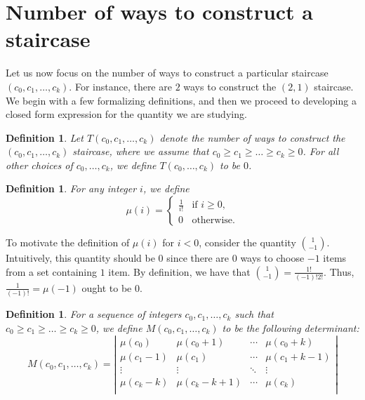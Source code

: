 \documentclass[12pt]{amsart}
\newtheorem{definition}[theorem]{Definition}
\newcommand{\ifact}{\mu}
\newcommand{\M}{M}
\newcommand{\newsection}[2]{
\section{#1 \label{#2}}
}
\begin{document}
\newsection{Number of ways to construct a staircase}{sec:numconstructions}
Let us now focus on the number of ways to construct a particular staircase $(c_0, c_1, \dots, c_k)$. For instance, there are $2$ ways to construct the $(2,1)$ staircase. We begin with a few formalizing definitions, and then we proceed to developing a closed form expression for the quantity we are studying.

\begin{definition}
Let $T(c_0, c_1, \dots, c_k)$ denote the number of ways to construct the $(c_0, c_1, \dots, c_k)$ staircase, where we assume that $c_0 \geq c_1 \geq \dots \geq c_k \geq 0$. For all other choices of $c_0, \dots, c_k$, we define $T(c_0, \dots, c_k)$ to be $0$.
\end{definition}




\begin{definition}
For any integer $i$, we define
$$
\ifact(i) = 
\begin{cases}
\frac{1}{i!} & \text{if } i \geq 0, \\
0 & \text{otherwise.}
\end{cases}
$$
\end{definition}

To motivate the definition of $\ifact(i)$ for $i < 0$, consider the quantity $\binom{1}{-1}$. Intuitively, this quantity should be $0$ since there are $0$ ways to choose $-1$ items from a set containing $1$ item. By definition, we have that $\binom{1}{-1} = \frac{1!}{(-1)!2!}$. Thus, $\frac{1}{(-1)!} = \ifact(-1)$ ought to be $0$.

\begin{definition}
For a sequence of integers $c_0, c_1, \dots, c_k$ such that $c_0 \geq c_1 \geq \dots \geq c_k \geq 0$, we define $\M(c_0, c_1, \dots, c_k)$ to be the following determinant:
$$
\M(c_0, c_1, \dots, c_k) = \left|
\begin{matrix}
\ifact(c_0) & \ifact(c_0+1) & \cdots & \ifact(c_0+k) \\
\ifact(c_1-1) & \ifact(c_1) & \cdots & \ifact(c_1+k-1) \\
\vdots & \vdots & \ddots & \vdots \\
\ifact(c_k-k) & \ifact(c_k-k+1) & \cdots & \ifact(c_k) \\
\end{matrix} \right|
$$
\end{definition}
\end{document}
